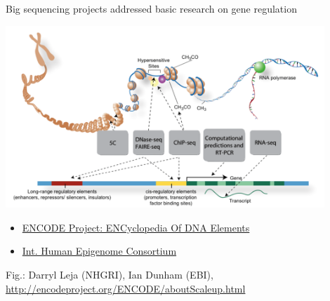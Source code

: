 \documentclass[10pt]{beamer}
\newcommand{\credit}[1]{{\vspace{\fill} \par \raggedleft \scriptsize \mdseries \color{mDarkBrown} #1 \par}}
\begin{document}
\begin{frame}{Big sequencing projects addressed basic research on gene regulation}
	\begin{center}
		\includegraphics[width=0.9\textwidth]{./figures/EncodeNatureGraphic.png}
	\end{center}
    \begin{itemize}
    	\item \href{http://www.nature.com/encode/threads}{ENCODE Project: ENCyclopedia Of DNA Elements}
    	\item \href{http://www.cell.com/consortium/IHEC}{Int. Human Epigenome Consortium}
    \end{itemize}
	\credit{Fig.: Darryl Leja (NHGRI), Ian Dunham (EBI), \url{http://encodeproject.org/ENCODE/aboutScaleup.html}}
\end{frame}
\end{document}

